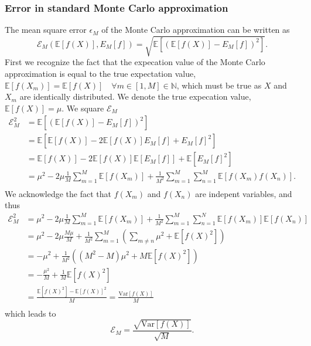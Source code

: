 \subsubsection*{Error in standard Monte Carlo approximation}
The mean square error $\epsilon_M$ of the Monte Carlo approximation can be written as 
\begin{equation}
    \mathcal{E}_M(\mathbb{E}[f(X)],E_M[f]) = \sqrt{\mathbb{E}[(\mathbb{E}[f(X)]-E_M[f])^2]}. 
\end{equation}
First we recognize the fact that the expecation value of the Monte Carlo approximation is equal to the true expectation value,  $\mathbb{E}[f(X_m)]=\mathbb{E}[f(X)]\quad \forall m\in[1, M]\in\mathbb{N}$, which must be true as $X$ and $X_m$ are identically distributed. We denote the true expecation value, $\mathbb{E}[f(X)]=\mu$. 
We square $\mathcal{E}_M$ 
\begin{equation*}
    \begin{split}
        \mathcal{E}_M^2 &= \mathbb{E}[(\mathbb{E}[f(X)]-E_M[f])^2] \\
        &= \mathbb{E}[\mathbb{E}[f(X)]-2\mathbb{E}[f(X)]E_M[f]+E_M[f]^2] \\
        &= \mathbb{E}[f(X)]-2\mathbb{E}[f(X)]\mathbb{E}[E_M[f]]+\mathbb{E}[E_M[f]^2] \\
        &= \mu^2-2\mu\frac{1}{M}\sum_{m=1}^M\mathbb{E}[f(X_m)] + \frac{1}{M^2}\sum_{m=1}^M\sum_{n=1}^M\mathbb{E}[f(X_m)f(X_n)]. \\
    \end{split}
\end{equation*}
We acknowledge the fact that $f(X_m)$ and $f(X_n)$ are indepent variables, and thus
\begin{equation*}
    \begin{split}
        \mathcal{E}_M^2 &= \mu^2-2\mu\frac{1}{M}\sum_{m=1}^M\mathbb{E}[f(X_m)] + \frac{1}{M^2}\sum_{m=1}^M\sum_{n=1}^N\mathbb{E}[f(X_m)]\mathbb{E}[f(X_n)] \\
        &= \mu^2-2\mu\frac{M\mu}{M} + \frac{1}{M^2}\sum_{m=1}^M(\sum_{m\neq n}\mu^2 + \mathbb{E}[f(X)^2]) \\
        &= -\mu^2+\frac{1}{M^2}((M^2-M)\mu^2 + M\mathbb{E}[f(X)^2]) \\
        &= -\frac{\mu^2}{M} + \frac{1}{M}\mathbb{E}[f(X)^2] \\
        &= \frac{\mathbb{E}[f(X)^2]-\mathbb{E}[f(X)]^2}{M} = \frac{\text{Var}[f(X)]}{M} \\
    \end{split}
\end{equation*}
which leads to 
\begin{equation*}
    \mathcal{E}_M = \frac{\sqrt{\text{Var}[f(X)]}}{\sqrt{M}}.
\end{equation*}



